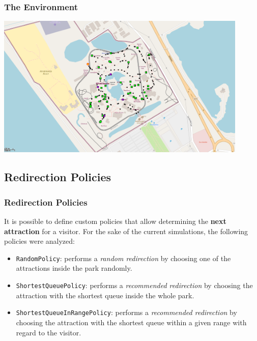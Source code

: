 \begin{frame}
    \frametitle{The Environment}

    \begin{center}
        \includegraphics[width=0.9\textwidth]{../img/simulation-screenshot}
        \label{fig:simulation-screenshot}
    \end{center}

\end{frame}

\subsection{Redirection Policies}\label{subsec:redirection-policies}

\begin{frame}
    \frametitle{Redirection Policies}
    It is possible to define custom policies that allow determining the \textbf{next attraction} for a visitor.
    For the sake of the current simulations, the following policies were analyzed:
    \begin{itemize}
        \item \texttt{RandomPolicy}: performs a \textit{random redirection} by choosing one of the attractions inside the park randomly.
        \item \texttt{ShortestQueuePolicy}: performs a \textit{recommended redirection} by choosing the attraction with the shortest queue inside the whole park.
        \item \texttt{ShortestQueueInRangePolicy}: performs a \textit{recommended redirection} by choosing the attraction with the shortest queue within a given range with regard to the visitor.
    \end{itemize}

\end{frame}

